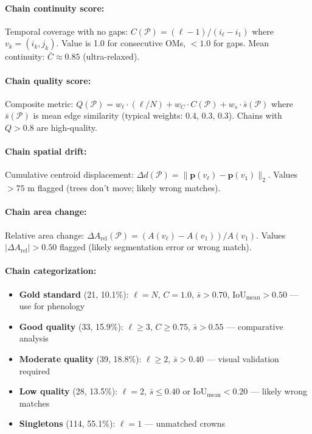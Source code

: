 \paragraph{Chain continuity score:}
Temporal coverage with no gaps: $C(\mathcal{P}) = (\ell - 1)/(i_\ell - i_1)$ where $v_k = (i_k, j_k)$. Value is 1.0 for consecutive OMs, $< 1.0$ for gaps. Mean continuity: $\bar{C} \approx 0.85$ (ultra-relaxed).

\paragraph{Chain quality score:}
Composite metric: $Q(\mathcal{P}) = w_{\ell} \cdot (\ell/N) + w_C \cdot C(\mathcal{P}) + w_s \cdot \bar{s}(\mathcal{P})$ where $\bar{s}(\mathcal{P})$ is mean edge similarity (typical weights: 0.4, 0.3, 0.3). Chains with $Q > 0.8$ are high-quality.

\paragraph{Chain spatial drift:}
Cumulative centroid displacement: $\Delta d(\mathcal{P}) = \|\mathbf{p}(v_{\ell}) - \mathbf{p}(v_{1})\|_2$. Values $> 75$ m flagged (trees don't move; likely wrong matches).

\paragraph{Chain area change:}
Relative area change: $\Delta A_{\text{rel}}(\mathcal{P}) = (A(v_{\ell}) - A(v_{1}))/A(v_{1})$. Values $|\Delta A_{\text{rel}}| > 0.50$ flagged (likely segmentation error or wrong match).

\paragraph{Chain categorization:}
\begin{itemize}[leftmargin=*, itemsep=1pt]
    \item \textbf{Gold standard} (21, 10.1\%): $\ell = N$, $C = 1.0$, $\bar{s} > 0.70$, $\text{IoU}_{\text{mean}} > 0.50$ — use for phenology
    \item \textbf{Good quality} (33, 15.9\%): $\ell \geq 3$, $C \geq 0.75$, $\bar{s} > 0.55$ — comparative analysis
    \item \textbf{Moderate quality} (39, 18.8\%): $\ell \geq 2$, $\bar{s} > 0.40$ — visual validation required
    \item \textbf{Low quality} (28, 13.5\%): $\ell = 2$, $\bar{s} \leq 0.40$ or $\text{IoU}_{\text{mean}} < 0.20$ — likely wrong matches
    \item \textbf{Singletons} (114, 55.1\%): $\ell = 1$ — unmatched crowns
\end{itemize}

